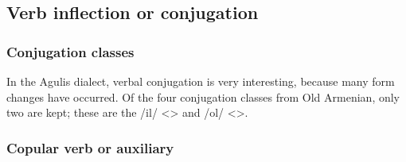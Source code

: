 \subsection{Verb inflection or conjugation}

\subsubsection{Conjugation classes}
In the Agulis dialect, verbal conjugation is very interesting, because many form changes have occurred. Of the four conjugation classes from Old Armenian, only two are kept; these are the /il/ <> and /ol/ <>. 




\begin{table}[H]
	\centering
	\caption{Change in conjugation classes from Classical Armenian to the Agulis dialect}
	\label{tab:Agulis:morphology:verb:class}
\end{table}

\subsubsection{Copular verb or auxiliary}
